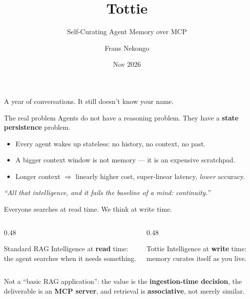 \documentclass[aspectratio=169,10pt]{beamer}
\title[Tottie]{Tottie}
\subtitle{Self-Curating Agent Memory over MCP}
\author{Frans Nekongo}
\institute{Meta Global AI Developer Hackathon \\ Indie Developer Track}
\date{Nov 2026}
\begin{document}
\begin{frame}[plain]\titlepage\end{frame}

\begin{frame}{A year of conversations. It still doesn't know your name.}
  \begin{block}{The real problem}
    Agents do not have a reasoning problem. They have a \textbf{state persistence} problem.
  \end{block}
  \begin{itemize}
    \item Every agent wakes up stateless: no history, no context, no past.
    \item A bigger context window is not memory --- it is an expensive scratchpad.
    \item Longer context $\Rightarrow$ linearly higher cost, super-linear latency, \emph{lower} accuracy.
  \end{itemize}
  \vfill
  \centering\itshape ``All that intelligence, and it fails the baseline of a mind: continuity.''
\end{frame}

\begin{frame}{Everyone searches at read time. We think at write time.}
  \begin{columns}
    \begin{column}{0.48\textwidth}
      \begin{block}{Standard RAG}
        Intelligence at \textbf{read} time: the agent searches when it needs something.
      \end{block}
    \end{column}
    \begin{column}{0.48\textwidth}
      \begin{alertblock}{Tottie}
        Intelligence at \textbf{write} time: memory curates itself as you live.
      \end{alertblock}
    \end{column}
  \end{columns}
  \vfill
  Not a ``basic RAG application'': the value is the \textbf{ingestion-time decision}, the deliverable is
  an \textbf{MCP server}, and retrieval is \textbf{associative}, not merely similar.
\end{frame}
\end{document}
